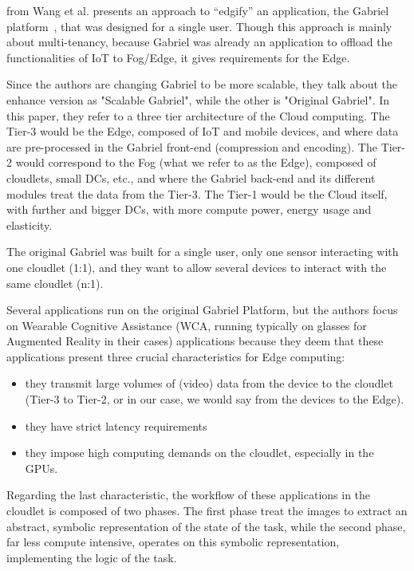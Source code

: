 \cite{WFGI+19} from Wang et al. presents an approach to ``edgify'' an
application, \ie the Gabriel platform~\cite{HCHR+14}, that was
designed for a single user.
%
Though this approach is mainly about multi-tenancy, because Gabriel
was already an application to offload the functionalities of IoT to
Fog/Edge, it gives requirements for the Edge.
%

Since the authors are changing Gabriel to be more scalable, they talk
about the enhance version as "Scalable Gabriel", while the other is
"Original Gabriel".
%
In this paper, they refer to a three tier architecture of the Cloud
computing.
%
The Tier-3 would be the Edge, composed of IoT and mobile devices, and
where data are pre-processed in the Gabriel front-end (\eg compression
and encoding).
%
The Tier-2 would correspond to the Fog (what we refer to as the Edge),
composed of cloudlets, small \acrshort{DC}s, etc., and where the
Gabriel back-end and its different modules treat the data from the
Tier-3.
%
The Tier-1 would be the Cloud itself, with further and bigger
\acrshort{DC}s, with more compute power, energy usage and elasticity.

The original Gabriel was built for a single user, \ie only one sensor
interacting with one cloudlet (1:1), and they want to allow several
devices to interact with the same cloudlet (n:1).

Several applications run on the original Gabriel Platform, but the
authors focus on Wearable Cognitive Assistance (WCA, running typically
on glasses for Augmented Reality in their cases) applications because
they deem that these applications present three crucial
characteristics for Edge computing:
\begin{itemize}
\item they transmit large volumes of (video) data from the device to
  the cloudlet (Tier-3 to Tier-2, or in our case, we would say from
  the devices to the Edge).
\item they have strict latency requirements
\item they impose high computing demands on the cloudlet, especially
  in the GPUs.
\end{itemize}
Regarding the last characteristic, the workflow of these applications
in the cloudlet is composed of two phases.
%
The first phase treat the images to extract an abstract, symbolic
representation of the state of the task, while the second phase, far
less compute intensive, operates on this symbolic representation,
implementing the logic of the task.

